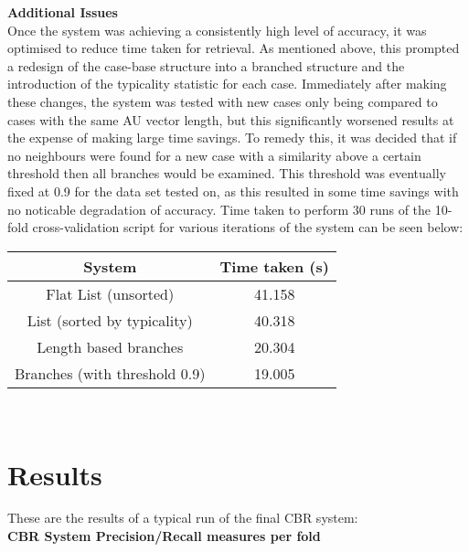 \documentclass[a4paper]{article}
\begin{document}
{\bf Additional Issues}\\
Once the system was achieving a consistently high level of accuracy, it was optimised to reduce time taken for retrieval. As mentioned above, this
prompted a redesign of the case-base structure into a branched structure and the introduction of the typicality statistic for each case. Immediately
after making these changes, the system was tested with new cases only being compared to cases with the same AU vector length, but this significantly
worsened results at the expense of making large time savings. To remedy this, it was decided that if no neighbours were found for a new case with
a similarity above a certain threshold then all branches would be examined. This threshold was eventually fixed at 0.9 for the data set tested on,
as this resulted in some time savings with no noticable degradation of accuracy. Time taken to perform 30 runs of the 10-fold cross-validation script
for various iterations of the system can be seen below:

\begin{center}
  \begin{tabular}{c|c}
    System & Time taken (s)\\
    \hline
    Flat List (unsorted) &  41.158\\
	List (sorted by typicality) &  40.318\\
	Length based branches &  20.304\\
	Branches (with threshold 0.9) &  19.005\\
  \end{tabular}\\
  \end{center}
  
  \newpage
 
\section{Results}

These are the results of a typical run of the final CBR system:\\

{\bf CBR System Precision/Recall measures per fold}\\
  
\end{document}
